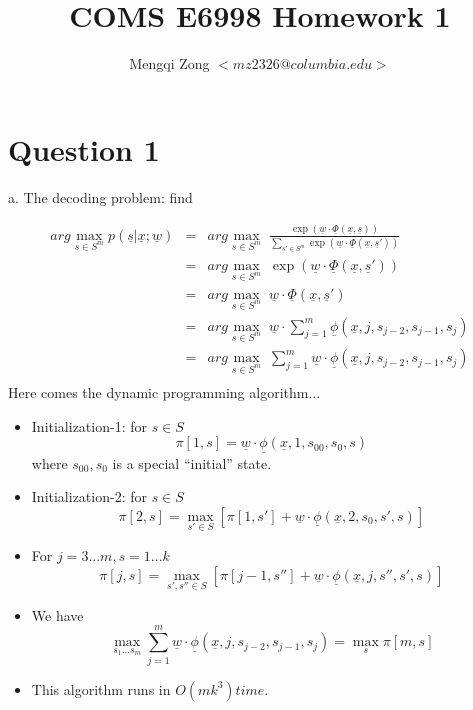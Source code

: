 \documentclass[12pt]{article}
\title{COMS E6998 Homework 1}
\author{Mengqi Zong $<mz2326@columbia.edu>$}
\begin{document}
\maketitle

\setlength{\parindent}{0in}

\section*{Question 1}

a. The decoding problem: find

\begin{eqnarray*}
arg \max_{s \in S^m} {p(\underline {s}| \underline{x}; \underline {w})}
  &=& arg \max_{s \in S^m} \; 
{\frac
{\exp {(\underline {w} \cdot \underline {\Phi} (\underline {x},
    \underline {s}))}} 
{\sum_{\underline {s}' \in S^m} {\exp {(\underline {w} \cdot
  \underline {\Phi} (\underline x, \underline {s}'))}}}} \\
&=& arg \max_{s \in S^m} \; {\exp {(\underline {w} \cdot \underline
{\Phi} (\underline {x}, \underline{s}'))}} \\
&=& arg \max_{s \in S^m} \; {\underline {w} \cdot \underline {\Phi}
(\underline {x}, \underline{s}')} \\
&=& arg \max_{s \in S^m} \; {\underline {w} \cdot \sum_{j=1}^{m}
{\underline {\phi} (\underline {x}, j, s_{j-2}, s_{j-1}, s_j)}} \\
&=& arg \max_{s \in S^m} \; {\sum_{j=1}^{m} {\underline {w} \cdot
  \underline {\phi} (\underline {x}, j, s_{j-2}, s_{j-1}, s_j)}} \\
\end{eqnarray*}
Here comes the dynamic programming algorithm...

\begin{itemize}
\item Initialization-1: for $s \in S$
  \begin{equation*}
    \pi [1,s] = \underline {w} \cdot \underline {\phi} (\underline
    {x}, 1, s_{00}, s_0, s)
  \end{equation*}
  where $s_{00}, s_0$ is a special ``initial'' state.
\item Initialization-2: for $s \in S$
  \begin{equation*}
    \pi [2,s] = \max_{s' \in S} {[\pi[1, s'] + \underline {w} \cdot
    \underline{\phi} (\underline {x}, 2, s_0, s', s)]}
  \end{equation*}
\item For $j = 3...m, s = 1...k$
  \begin{equation*}
    \pi [j,s] = \max_{s',s'' \in S} {[\pi[j-1, s''] + \underline {w}
    \cdot \underline{\phi} (\underline {x}, j, s'', s', s)]}
  \end{equation*}
\item We have
  \begin{equation*}
    \max_{s_1...s_m} {\sum_{j=1}^m {\underline {w} \cdot \underline
      {\phi} (\underline {x}, j, s_{j-2}, s_{j-1}, s_j)}} = \max_s
  {\pi[m,s]}
  \end{equation*}
\item This algorithm runs in $O(mk^3) time.$
\end{itemize}
\end{document}
